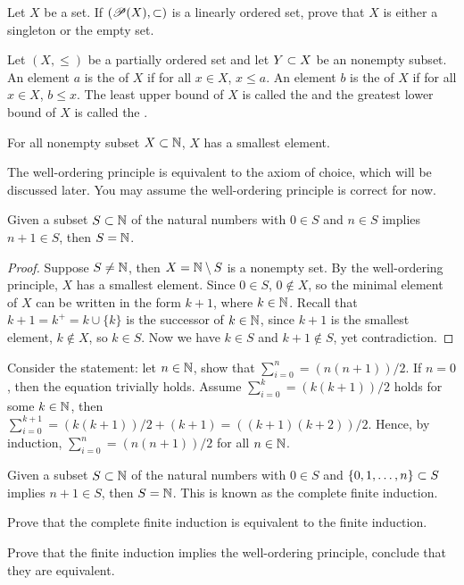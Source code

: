 \documentclass[10pt]{article}
\begin{document}
\begin{problem}
    Let $X$ be a set. If $(\mathscr{P}(X),\subset)$ is a linearly ordered set, prove that $X$ is either a singleton or the empty set.
\end{problem}
\begin{definition}
    Let $(X,\le)$ be a partially ordered set and let $Y\subset X$ be an nonempty subset. An element $a$ is the  of $X$ if for all $x\in X$, $x\le a$. An element $b$ is the  of $X$ if for all $x\in X$, $b\le x$. The least upper bound of $X$ is called the  and the greatest lower bound of $X$ is called the .
\end{definition}
\begin{theorem}
    For all nonempty subset $X\subset\mathbb{N}$, $X$ has a smallest element.
\end{theorem}
\par
The well-ordering principle is equivalent to the axiom of choice, which will be discussed later. You may assume the well-ordering principle is correct for now. 
\begin{theorem}
    Given a subset $S\subset\mathbb{N}$ of the natural numbers with $0\in S$ and $n\in S$ implies $n+1\in S$, then $S=\mathbb{N}$.
\end{theorem}
\begin{proof}
    Suppose $S\ne\mathbb{N}$, then $X=\mathbb{N}\setminus S$ is a nonempty set. By the well-ordering principle, $X$ has a smallest element. Since $0\in S$, $0\notin X$, so the minimal element of $X$ can be written in the form $k+1$, where $k\in\mathbb{N}$. Recall that $k+1={k}^{+}=k\cup\{k\}$ is the successor of $k\in\mathbb{N}$, since $k+1$ is the smallest element, $k\notin X$, so $k\in S$. Now we have $k\in S$ and $k+1\notin S$, yet contradiction.
\end{proof}
\begin{example}
    Consider the statement: let $n\in\mathbb{N}$, show that ${\sum}_{i=0}^{n}=(n(n+1))/2$. If $n=0$, then the equation trivially holds. Assume ${\sum}_{i=0}^{k}=(k(k+1))/2$ holds for some $k\in\mathbb{N}$, then ${\sum}_{i=0}^{k+1}=(k(k+1))/2+(k+1)=((k+1)(k+2))/2$. Hence, by induction, ${\sum}_{i=0}^{n}=(n(n+1))/2$ for all $n\in\mathbb{N}$.
\end{example}
\begin{problem}
    Given a subset $S\subset\mathbb{N}$ of the natural numbers with $0\in S$ and $\{0,1,\dots,n\}\subset S$ implies $n+1\in S$, then $S=\mathbb{N}$. This is known as the complete finite induction.
\end{problem}
\begin{problem}
    Prove that the complete finite induction is equivalent to the finite induction.
\end{problem}
\begin{problem}
    Prove that the finite induction implies the well-ordering principle, conclude that they are equivalent.
\end{problem}
\end{document}
